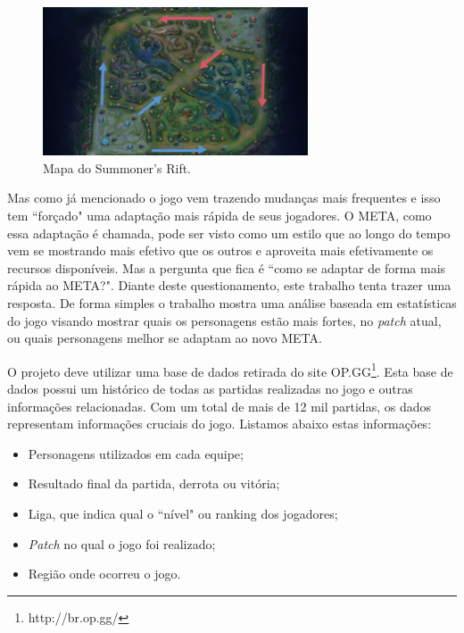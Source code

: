 \documentclass[a4paper]{article}
\begin{document}
\begin{figure}[ht]
\centering
\includegraphics[width=0.7\textwidth]{imagens/rotas}
\caption{\label{fig:map}Mapa do Summoner's Rift.}
\end{figure}

Mas como já mencionado o jogo vem trazendo mudanças mais frequentes e isso tem ``forçado" uma adaptação mais rápida de seus jogadores. O META, como essa adaptação é chamada, pode ser visto como um estilo que ao longo do tempo vem se mostrando mais efetivo que os outros e aproveita mais efetivamente os recursos disponíveis. Mas a pergunta que fica é ``como se adaptar de forma mais rápida ao META?".  Diante deste questionamento, este trabalho tenta trazer uma resposta. De forma simples o trabalho mostra uma análise baseada em estatísticas do jogo visando mostrar quais os personagens estão mais fortes, no \textit{patch} atual, ou quais personagens melhor se adaptam ao novo META.  

O projeto deve utilizar uma base de dados retirada do site OP.GG\footnote{http://br.op.gg/}. Esta base de dados possui um histórico de todas as partidas realizadas no jogo e outras informações relacionadas. Com um total de mais de 12 mil partidas, os dados representam informações cruciais do jogo. Listamos abaixo estas informações: 

\begin{itemize}
	\item Personagens utilizados em cada equipe;
    
	\item Resultado final da partida, derrota ou vitória;
    
    \item Liga, que indica qual o ``nível" ou ranking dos jogadores;
    
    \item \textit{Patch} no qual o jogo foi realizado;
    
    \item Região onde ocorreu o jogo.
\end{itemize}  
\end{document}
